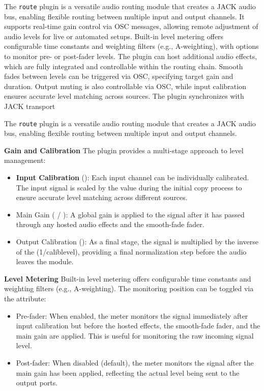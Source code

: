 The {\tt route} plugin is a versatile audio routing module that
creates a JACK audio bus, enabling flexible routing between multiple
input and output channels. It supports real-time gain control via OSC
messages, allowing remote adjustment of audio levels for live or
automated setups. Built-in level metering offers configurable time
constants and weighting filters (e.g., A-weighting), with options to
monitor pre- or post-fader levels. The plugin can host additional
audio effects, which are fully integrated and controllable within the
routing chain. Smooth fades between levels can be triggered via OSC,
specifying target gain and duration. Output muting is also
controllable via OSC, while input calibration ensures accurate level
matching across sources. The plugin synchronizes with JACK transport

The {\tt route} plugin is a versatile audio routing module that
creates a JACK audio bus, enabling flexible routing between multiple
input and output channels.

{\bf Gain and Calibration} The plugin provides a
multi-stage approach to level management:

\begin{itemize}
\item {\bf Input Calibration} (): Each input
  channel can be individually calibrated. The input signal is scaled
  by the  value during the initial copy process
  to ensure accurate level matching across different sources.
\item Main Gain ( / ): A global gain is
  applied to the signal after it has passed through any hosted audio
  effects and the smooth-fade fader.
\item Output Calibration (): As a final stage, the
  signal is multiplied by the inverse of the 
  (1/caliblevel), providing a final normalization step before the
  audio leaves the module.
\end{itemize}

{\bf Level Metering} Built-in level metering offers configurable time
constants and weighting filters (e.g., A-weighting). The monitoring
position can be toggled via the  attribute:
\begin{itemize}
\item Pre-fader: When enabled, the meter monitors the signal
  immediately after input calibration but before the hosted effects,
  the smooth-fade fader, and the main gain are applied. This is useful
  for monitoring the raw incoming signal level.
\item Post-fader: When disabled (default), the meter monitors the
  signal after the main gain has been applied, reflecting the actual
  level being sent to the output ports.
\end{itemize}

